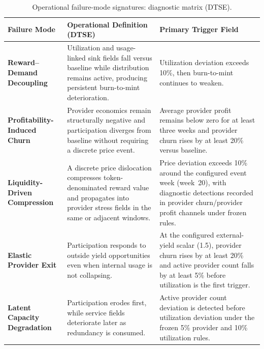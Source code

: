 \begin{table}[htbp]
    \centering
    \footnotesize
    \renewcommand{\arraystretch}{1.25}
    \begin{tabular}{@{}
        >{\raggedright\arraybackslash}p{}
        >{\raggedright\arraybackslash}p{}
        >{\raggedright\arraybackslash}p{}
    @{}}
        \toprule
        \textbf{Failure Mode} & \textbf{Operational Definition (DTSE)} & \textbf{Primary Trigger Field} \\
        \midrule
        \textbf{Reward--Demand Decoupling} & Utilization and usage-linked sink fields fall versus baseline while distribution remains active, producing persistent burn-to-mint deterioration. & Utilization deviation exceeds 10\%, then burn-to-mint continues to weaken. \\
        \addlinespace
        \textbf{Profitability-Induced Churn} & Provider economics remain structurally negative and participation diverges from baseline without requiring a discrete price event. & Average provider profit remains below zero for at least three weeks and provider churn rises by at least 20\% versus baseline. \\
        \addlinespace
        \textbf{Liquidity-Driven Compression} & A discrete price dislocation compresses token-denominated reward value and propagates into provider stress fields in the same or adjacent windows. & Price deviation exceeds 10\% around the configured event week (week~20), with diagnostic detections recorded in provider churn/provider profit channels under frozen rules. \\
        \addlinespace
        \textbf{Elastic Provider Exit} & Participation responds to outside yield opportunities even when internal usage is not collapsing. & At the configured external-yield scalar (1.5), provider churn rises by at least 20\% and active provider count falls by at least 5\% before utilization is the first trigger. \\
        \addlinespace
        \textbf{Latent Capacity Degradation} & Participation erodes first, while service fields deteriorate later as redundancy is consumed. & Active provider count deviation is detected before utilization deviation under the frozen 5\% provider and 10\% utilization rules. \\
        \bottomrule
    \end{tabular}
    \caption{Operational failure-mode signatures: diagnostic matrix (DTSE).}
    \label{tab:failure_modes}
\end{table}

